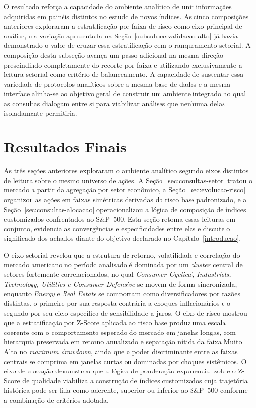 O resultado reforça a capacidade do ambiente analítico de unir informações adquiridas em painéis distintos no estudo de novos índices. As cinco composições anteriores exploraram a estratificação por faixa de risco como eixo principal de análise, e a variação apresentada na Seção~\ref{subsubsec:validacao-alto} já havia demonstrado o valor de cruzar essa estratificação com o ranqueamento setorial. A composição desta subseção avança um passo adicional na mesma direção, prescindindo completamente do recorte por faixa e utilizando exclusivamente a leitura setorial como critério de balanceamento. A capacidade de sustentar essa variedade de protocolos analíticos sobre a mesma base de dados e a mesma interface alinha-se ao objetivo geral de construir um ambiente integrado no qual as consultas dialogam entre si para viabilizar análises que nenhuma delas isoladamente permitiria.

\section{Resultados Finais}
\label{sec:resultados-todo}

As três seções anteriores exploraram o ambiente analítico segundo eixos distintos de leitura sobre o mesmo universo de ações. A Seção~\ref{sec:consultas-setor} tratou o mercado a partir da agregação por setor econômico, a Seção~\ref{sec:evolucao-risco} organizou as ações em faixas simétricas derivadas do risco base padronizado, e a Seção~\ref{sec:consultas-alocacao} operacionalizou a lógica de composição de índices customizados confrontados ao S\&P~500. Esta seção retoma essas leituras em conjunto, evidencia as convergências e especificidades entre elas e discute o significado dos achados diante do objetivo declarado no Capítulo~\ref{introducao}.

O eixo setorial revelou que a estrutura de retorno, volatilidade e correlação do mercado americano no período analisado é dominada por um \textit{cluster} central de setores fortemente correlacionados, no qual \textit{Consumer Cyclical, Industrials, Technology, Utilities e Consumer Defensive} se movem de forma sincronizada, enquanto \textit{Energy} e \textit{Real Estate} se comportam como diversificadores por razões distintas, o primeiro por sua resposta contrária a choques inflacionários e o segundo por seu ciclo específico de sensibilidade a juros. O eixo de risco mostrou que a estratificação por Z-Score aplicada ao risco base produz uma escala coerente com o comportamento esperado do mercado em janelas longas, com hierarquia preservada em retorno anualizado e separação nítida da faixa Muito Alto no \textit{maximum drawdown}, ainda que o poder discriminante entre as faixas centrais se comprima em janelas curtas ou dominadas por choques sistêmicos. O eixo de alocação demonstrou que a lógica de ponderação exponencial sobre o Z-Score de qualidade viabiliza a construção de índices customizados cuja trajetória histórica pode ser lida como aderente, superior ou inferior ao S\&P~500 conforme a combinação de critérios adotada.

